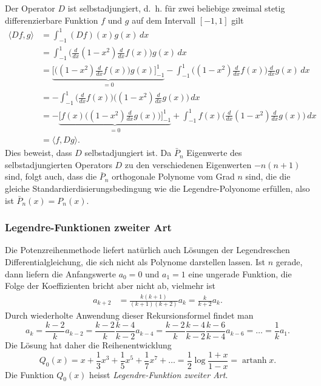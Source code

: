 Der Operator $D$ ist selbstadjungiert, d.~h.
für zwei beliebige zweimal stetig differenzierbare Funktion $f$ und $g$
auf dem Intervall $[-1,1]$ gilt
\begin{align*}
\langle Df,g\rangle
&=
\int_{-1}^1 (Df)(x) g(x) \,dx
\\
&=
\int_{-1}^1
\biggl(\frac{d}{dx} (1-x^2)\frac{d}{dx}f(x)\biggr) g(x)
\,dx
\\
&=
\underbrace{
\biggl[
\biggl((1-x^2)\frac{d}{dx}f(x)\biggr) g(x)
\biggr]_{-1}^1
}_{\displaystyle = 0}
-
\int_{-1}^1
\biggl((1-x^2)\frac{d}{dx}f(x)\biggr) \frac{d}{dx}g(x)
\,dx
\\
&=
-
\int_{-1}^1
\biggl(\frac{d}{dx}f(x)\biggr) \biggl((1-x^2)\frac{d}{dx}g(x)\biggr)
\,dx
\\
&=
-
\underbrace{
\biggl[
f(x) \biggl((1-x^2)\frac{d}{dx}g(x)\biggr)
\biggr]_{-1}^1}_{\displaystyle = 0}
+
\int_{-1}^1
f(x) \biggl(\frac{d}{dx}(1-x^2)\frac{d}{dx}g(x)\biggr)
\,dx
\\
&=
\langle f,Dg\rangle.
\end{align*}
Dies beweist, dass $D$ selbstadjungiert ist.
Da $\bar{P}_n$ Eigenwerte des selbstadjungierten Operators $D$ zu
den verschiedenen Eigenwerten $-n(n+1)$ sind, folgt auch, dass
die $\bar{P}_n$ orthogonale Polynome vom Grad $n$ sind, die die 
gleiche Standardierdisierungsbedingung wie die Legendre-Polyonome
erfüllen, also ist $\bar{P}_n(x)=P_n(x)$.

%
%
\subsubsection{Legendre-Funktionen zweiter Art}
%
Die Potenzreihenmethode liefert natürlich auch Lösungen der
Legendreschen Differentialgleichung, die sich nicht als Polynome
darstellen lassen.
Ist $n$ gerade, dann liefern die Anfangswerte $a_0=0$ und $a_1=1$ 
eine ungerade Funktion, die Folge der Koeffizienten bricht
aber nicht ab, vielmehr ist
\begin{align*}
a_{k+2}
&=
\frac{k(k+1)}{(k+1)(k+2)}a_k
=
\frac{k}{k+2}a_k.
\end{align*}
Durch wiederholte Anwendung dieser Rekursionsformel findet man
\[
a_{k}
=
\frac{k-2}{k}a_{k-2}
=
\frac{k-2}{k}\frac{k-4}{k-2}a_{k-4}
=
\frac{k-2}{k}\frac{k-4}{k-2}\frac{k-6}{k-4}a_{k-6}
=
\dots
=
\frac{1}{k}a_1.
\]
Die Lösung hat daher die Reihenentwicklung
\[
Q_0(x) = x+\frac13x^3 + \frac15x^5 + \frac17x^7+\dots
=
\frac12\log \frac{1+x}{1-x}
=
\operatorname{artanh}x.
\]
Die Funktion $Q_0(x)$ heisst {\em Legendre-Funktion zweiter Art}.

